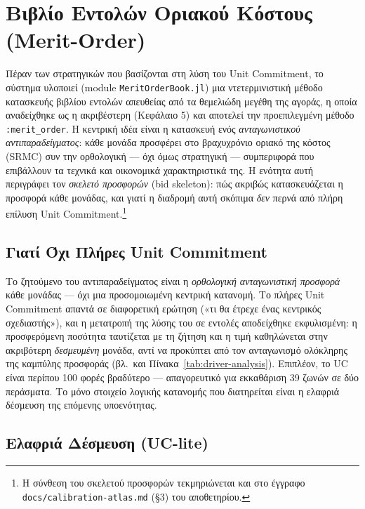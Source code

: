 \section{Βιβλίο Εντολών Οριακού Κόστους (Merit-Order)}
\label{sec:merit-order-book}

Πέραν των στρατηγικών που βασίζονται στη λύση του Unit Commitment, το σύστημα υλοποιεί (module \texttt{MeritOrderBook.jl}) μια ντετερμινιστική μέθοδο κατασκευής βιβλίου εντολών απευθείας από τα θεμελιώδη μεγέθη της αγοράς, η οποία αναδείχθηκε ως η ακριβέστερη (Κεφάλαιο 5) και αποτελεί την προεπιλεγμένη μέθοδο \texttt{:merit\_order}. Η κεντρική ιδέα είναι η κατασκευή ενός \emph{ανταγωνιστικού αντιπαραδείγματος}: κάθε μονάδα προσφέρει στο βραχυχρόνιο οριακό της κόστος (SRMC) συν την ορθολογική --- όχι όμως στρατηγική --- συμπεριφορά που επιβάλλουν τα τεχνικά και οικονομικά χαρακτηριστικά της. Η ενότητα αυτή περιγράφει τον \emph{σκελετό προσφορών} (bid skeleton): πώς ακριβώς κατασκευάζεται η προσφορά κάθε μονάδας, και γιατί η διαδρομή αυτή σκόπιμα \emph{δεν} περνά από πλήρη επίλυση Unit Commitment.\footnote{Η σύνθεση του σκελετού προσφορών τεκμηριώνεται και στο έγγραφο \texttt{docs/calibration-atlas.md} (§3) του αποθετηρίου.}

\subsection{Γιατί Όχι Πλήρες Unit Commitment}
\label{subsec:why-not-uc}

Το ζητούμενο του αντιπαραδείγματος είναι η \emph{ορθολογική ανταγωνιστική προσφορά} κάθε μονάδας --- όχι μια προσομοιωμένη κεντρική κατανομή. Το πλήρες Unit Commitment απαντά σε διαφορετική ερώτηση («τι θα έτρεχε ένας κεντρικός σχεδιαστής»), και η μετατροπή της λύσης του σε εντολές αποδείχθηκε εκφυλισμένη: η προσφερόμενη ποσότητα ταυτίζεται με τη ζήτηση και η τιμή καθηλώνεται στην ακριβότερη \emph{δεσμευμένη} μονάδα, αντί να προκύπτει από τον ανταγωνισμό ολόκληρης της καμπύλης προσφοράς (βλ.\ και Πίνακα~\ref{tab:driver-analysis}). Επιπλέον, το UC είναι περίπου 100 φορές βραδύτερο --- απαγορευτικό για εκκαθάριση 39 ζωνών σε δύο περάσματα. Το μόνο στοιχείο λογικής κατανομής που διατηρείται είναι η ελαφριά δέσμευση της επόμενης υποενότητας.

\subsection{Ελαφριά Δέσμευση (UC-lite)}
\label{subsec:uc-lite}

